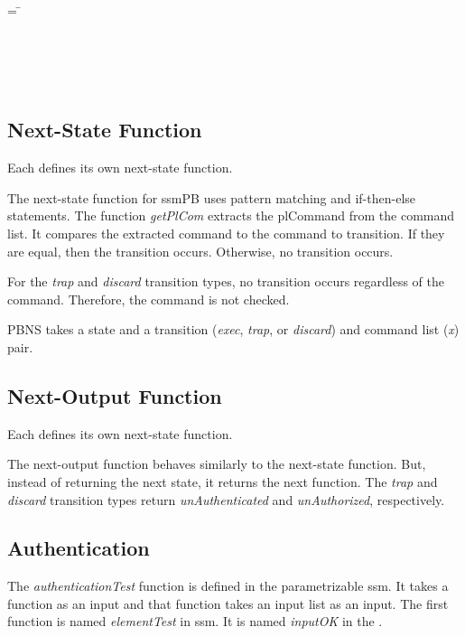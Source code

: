 \documentclass[../../main/main.tex]{subfiles}
\begin{document}
\begin{tabbing}
 = \= \\
						\>\HOLTokenBar{}  \\
						\>\HOLTokenBar{}  \\
						\>\HOLTokenBar{} \\
          					\>\HOLTokenBar{}  \\
						\>\HOLTokenBar{} 
\end{tabbing}

\subsection{Next-State Function}
Each  defines its own next-state function.  

\HOLssmPBIntegratedTheoremsPBNSXXdef

The next-state function for ssmPB uses pattern matching and if-then-else statements.  The function \textit{getPlCom} extracts the plCommand from the command list. It compares the extracted command to the command to transition.  If they are equal, then the transition occurs.  Otherwise, no transition occurs. 

For the \textit{trap} and \textit{discard} transition types, no transition occurs regardless of the command.  Therefore, the command is not checked.


PBNS takes a state and a transition (\textit{exec}, \textit{trap}, or \textit{discard}) and command list (\textit{x}) pair.
\subsection{Next-Output Function}
Each  defines its own next-state function. 

\HOLssmPBIntegratedTheoremsPBOutXXdef

The next-output function behaves similarly to the next-state function.  But, instead of returning the next state, it returns the next function.  The \textit{trap} and \textit{discard} transition types return \textit{unAuthenticated} and \textit{unAuthorized}, respectively.

\subsection{Authentication}
The \textit{authenticationTest} function is defined in the parametrizable ssm.  It takes a function as an input and that function takes an input list as an input.  The first function is named \textit{elementTest} in ssm.  It is named \textit{inputOK} in the .
\end{document}
